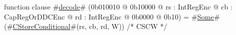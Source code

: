 function clause #\hyperref[sailMIPSzdecode]{decode}# (0b010010 @ 0b10000 @ rs : IntRegEnc @ cb : CapRegOrDDCEnc @ rd : IntRegEnc @ 0b0000 @ 0b10) = #\hyperref[sailMIPSzSome]{Some}#(#\hyperref[sailMIPSzCStoreConditional]{CStoreConditional}#(rs, cb, rd, W)) /* CSCW */
